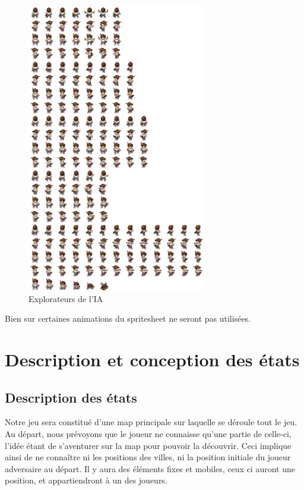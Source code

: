 \documentclass[a4paper,12pt]{article}
\begin{document}
\begin{figure}[H]
\begin{center}
  \includegraphics[width=0.7\textwidth]{images/Settlers_Silver.png}
  \caption{Explorateurs de l'IA}
 \end{center}
\end{figure}

Bien sur certaines animations du spritesheet ne seront pas utilisées.

\clearpage

\section{Description et conception des états}

\subsection{Description des états}

Notre jeu sera constitué d'une map principale sur laquelle se déroule tout le jeu. Au départ, nous prévoyons que le joueur ne connaisse qu'une partie de celle-ci, l'idée étant de s'aventurer sur la map pour pouvoir la découvrir. Ceci implique ainsi de ne connaître ni les positions des villes, ni la position initiale du joueur adversaire au départ.
Il y aura des éléments fixes et mobiles, ceux ci auront une position, et appartiendront à un des joueurs.
\end{document}
